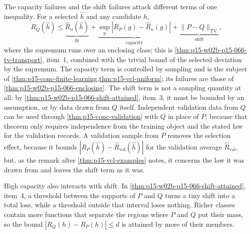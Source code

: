The capacity failures and the shift failures attack different terms of
one inequality. For a selected \(\widehat h\) and any candidate \(h\),
\[
 R_Q(\widehat h)\leq
 \underbrace{\widehat R_n(\widehat h)}_{\text{fit}}
 +\underbrace{\sup_{g}|R_P(g)-\widehat R_n(g)|}_{\text{capacity}}
 +\underbrace{\|P-Q\|_{\mathrm{TV}}}_{\text{shift}},
\]
where the supremum runs over an enclosing class; this is
\cref{thm:p15-w02b-p15-066-tv-transport}, item~1, combined with the
trivial bound of the selected deviation by the supremum. The capacity
term is controlled by sampling and is the subject of
\cref{thm:p15-conc-finite-learning,thm:p15-vcl-uniform}; its failures
are those of \cref{thm:p15-w02b-p15-066-enclosing}. The shift term is
not a sampling quantity at all: by
\cref{thm:p15-w02b-p15-066-shift-attained}, item~3, it must be bounded
by an assumption, or by data drawn from \(Q\) itself. Independent
validation data from \(Q\) can be used through
\cref{thm:p15-conc-validation} with \(Q\) in place of \(P\), because
that theorem only requires independence from the training object and
the stated law for the validation records. A validation sample from
\(P\) removes the selection effect, because it bounds
\(|R_P(\widehat h)-\widehat R_{\mathrm{val}}(\widehat h)|\) for the
validation average \(\widehat R_{\mathrm{val}}\), but, as the remark after
\cref{thm:p15-vcl-examples} notes, it concerns the law it was drawn
from and leaves the shift term as it was.

High capacity also interacts with shift. In
\cref{thm:p15-w02b-p15-066-shift-attained}, item~4, a threshold between
the supports of \(P\) and \(Q\) turns a tiny shift into a total loss,
while a threshold outside that interval loses nothing. Richer classes
contain more functions that separate the regions where \(P\) and \(Q\)
put their mass, so the bound \(|R_Q(h)-R_P(h)|\leq d\) is attained by
more of their members.

